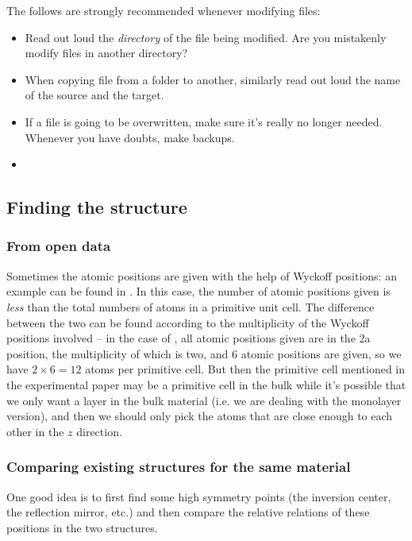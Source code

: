 \documentclass[hyperref, a4paper, 12pt]{report}
\begin{document}
The follows are strongly recommended whenever modifying files:
\begin{itemize}
    \item Read out loud the \emph{directory} of the file being modified.
    Are you mistakenly modify files in another directory?
    \item When copying file from a folder to another,
    similarly read out loud the name of the source and the target.
    \item If a file is going to be overwritten,
    make sure it's really no longer needed.
    Whenever you have doubts, 
    make backups.
    \item 
\end{itemize}

\subsection{Finding the structure}

\subsubsection{From open data}

Sometimes the atomic positions are given with the help of Wyckoff positions:
an example can be found in \cite{mar1992metal}.
In this case, 
the number of atomic positions given is \emph{less} than 
the total numbers of atoms in a primitive unit cell.
The difference between the two can be found 
according to the multiplicity of 
the Wyckoff positions involved -- 
in the case of \cite{mar1992metal},
all atomic positions given are in the 2a position, 
the multiplicity of which is two, 
and 6 atomic positions are given, 
so we have $2 \times 6 = 12$ atoms per primitive cell. 
But then the primitive cell mentioned in the experimental paper 
may be a primitive cell in the bulk 
while it's possible that we only want a layer in the bulk material 
(i.e. we are dealing with the monolayer version),
and then we should only pick the atoms that are close enough to each other 
in the $z$ direction.

\subsubsection{Comparing existing structures for the same material}

One good idea is to first find some high symmetry points 
(the inversion center, the reflection mirror, etc.) 
and then compare the relative relations of these positions 
in the two structures.
\end{document}
